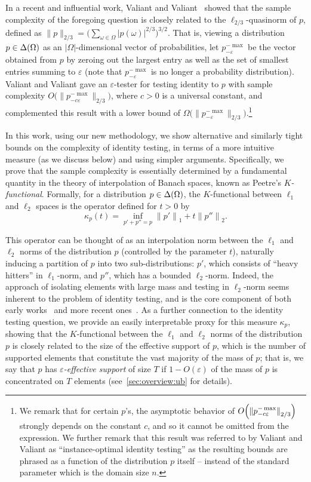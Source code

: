 \documentclass[11pt]{article}
\theoremstyle{remark}   	\newtheorem{remark}[theorem]{Remark}
\theoremstyle{definition}   	\newaliascnt{defn}{theorem}
\newcommand{\eps}{\ensuremath{\varepsilon}\xspace}
\newcommand{\bigO}[1]{{O\mleft( #1 \mright)}}
\newcommand{\norm}[1]{\lVert#1{\rVert}}
\newcommand{\normone}[1]{{\norm{#1}}_1}
\newcommand{\normtwo}[1]{{\norm{#1}}_2}
\newcommand{\abs}[1]{\left\lvert #1 \right\rvert}
\newcommand{\lp}[1][1]{\ell_{#1}}
\newcommand{\kf}[1]{\kappa_{#1}}
\begin{document}
In a recent and influential work, Valiant and Valiant~\cite{VV:14} showed that the sample complexity of the foregoing question is closely related to the $\lp[2/3]$-quasinorm of $p$, defined as $\norm{p}_{2/3} = \big(\sum_{\omega \in \Omega} \abs{p(\omega)}^{2/3}\big)^{3/2}$. That is, viewing a distribution $p \in\Delta\!\left(\Omega\right)$ as an $\abs{\Omega}$-dimensional vector of probabilities, let $p_{-\eps}^{-\max}$ be the vector obtained from $p$ by zeroing out the largest entry as well as the set of smallest entries summing to $\eps$ (note that $p_{-\eps}^{-\max}$ is no longer a probability distribution). Valiant and Valiant gave an $\eps$-tester for testing identity to $p$ with sample complexity $O\big({\norm{p_{-c \eps}^{-\max}}_{2/3}}\big)$, where $c>0$ is a universal constant, and complemented this result with a lower bound of $\Omega\big({\norm{p_{-\eps}^{-\max}}_{2/3}}\big)$.\footnote{We remark that for certain $p$'s, the asymptotic behavior of $\bigO{\norm{p_{-c\eps}^{-\max}}_{2/3}}$ strongly depends on the constant $c$, and so it cannot be omitted from the expression. We further remark that this result was referred to by Valiant and Valiant  as ``instance-optimal identity testing'' as the resulting bounds are phrased as a function of the distribution $p$ itself -- instead of the standard parameter which is the domain size $n$.}

In this work, using our new methodology, we show alternative and similarly tight bounds on the complexity of identity testing, in terms of a more intuitive measure (as we discuss below) and using simpler arguments. Specifically, we prove that the sample complexity is essentially determined by a fundamental quantity in the theory of interpolation of Banach spaces, known as Peetre's \emph{$K$-functional}. Formally, for a distribution $p\in\Delta\!\left(\Omega\right)$, the $K$-functional between $\lp[1]$ and $\lp[2]$ spaces is the operator defined for $t>0$ by
\begin{equation*}
    \kf{p}(t) = \inf_{ p'+ p''=p} \normone{p'} + t\normtwo{p''}.
\end{equation*}

This operator can be thought of as an interpolation norm between the $\lp[1]$ and $\lp[2]$ norms of the distribution $p$ (controlled by the parameter $t$), naturally inducing a partition of $p$ into two sub-distributions: $p'$, which consists of ``heavy hitters'' in $\lp[1]$-norm, and $p''$, which has a bounded $\lp[2]$-norm. Indeed, the approach of isolating elements with large mass and testing in $\lp[2]$-norm seems inherent to the problem of identity testing, and is the core component of both early works~\cite{GRexp:00,BFFKRW:01} and more recent ones~\cite{DKN:15,DK:16,Gol:16}. As a further connection to the identity testing question, we provide an easily interpretable proxy for this measure $\kf{p}$, showing that the $K$-functional between the $\lp[1]$ and $\lp[2]$ norms of the distribution $p$ is closely related to the size of the effective support of $p$, which is the number of supported elements that constitute the vast majority of the mass of $p$; that is, we say that $p$ has \emph{$\eps$-effective support} of size $T$ if $1- O(\eps)$ of the mass of $p$ is concentrated on $T$ elements (see~\autoref{sec:overview:ub} for details).
\end{document}
